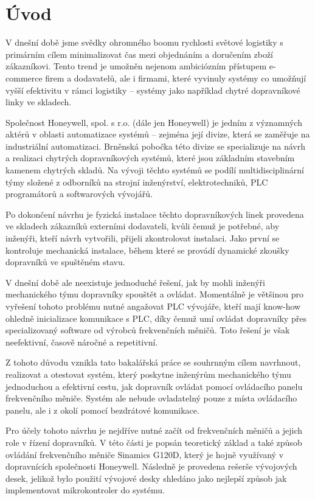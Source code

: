 \chapter*{Úvod}\label{chap:uvod}

V dnešní době jsme svědky ohromného boomu rychlosti světové logistiky s primárním cílem minimalizovat čas mezi objednáním a doručením zboží zákazníkovi. Tento trend je umožněn nejenom ambiciózním přístupem e-commerce firem a dodavatelů, ale i firmami, které vyvinuly systémy co umožňují vyšší efektivitu v rámci logistiky – systémy jako například chytré dopravníkové linky ve skladech.

Společnost Honeywell, spol. s r.o. (dále jen Honeywell) je jedním z významných aktérů v oblasti automatizace systémů – zejména její divize, která se zaměřuje na industriální automatizaci. Brněnská pobočka této divize se specializuje na návrh a realizaci chytrých dopravníkových systémů, které jsou základním stavebním kamenem chytrých skladů. Na vývoji těchto systémů se podílí multidisciplinární týmy složené z odborníků na strojní inženýrství, elektrotechniků, PLC programátorů a softwarových vývojářů.

Po dokončení návrhu je fyzická instalace těchto dopravníkových linek provedena ve skladech zákazníků externími dodavateli, kvůli čemuž je potřebné, aby inženýři, kteří návrh vytvořili, přijeli zkontrolovat instalaci. Jako první se kontroluje mechanická instalace, během které se provádí dynamické zkoušky dopravníků ve spuštěném stavu.

V dnešní době ale neexistuje jednoduché řešení, jak by mohli inženýři mechanického týmu dopravníky spouštět a ovládat. Momentálně je většinou pro vyřešení tohoto problému nutné angažovat PLC vývojáře, kteří mají know-how ohledně inicializace komunikace s PLC, díky čemuž umí ovládat dopravníky přes specializovaný software od výrobců frekvenčních měničů. Toto řešení je však neefektivní, časově náročné a repetitivní.

Z tohoto důvodu vznikla tato bakalářská práce se souhrnným cílem navrhnout, realizovat a otestovat systém, který poskytne inženýrům mechanického týmu jednoduchou a efektivní cestu, jak dopravník ovládat pomocí ovládacího panelu frekvenčního měniče. Systém ale nebude ovladatelný pouze z místa ovládacího panelu, ale i z okolí pomocí bezdrátové komunikace.

Pro účely tohoto návrhu je nejdříve nutné začít od frekvenčních měničů a jejich role v řízení dopravníků. V této části je popsán teoretický základ a také způsob ovládání frekvenčního měniče Sinamics G120D, který je hojně využívaný v dopravnících společnosti Honeywell. Následně je provedena rešerše vývojových desek, jelikož bylo použití vývojové desky shledáno jako nejlepší způsob jak implementovat mikrokontroler do systému.


